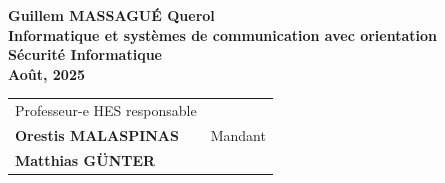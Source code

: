 \begin{titlepage}
\begin{center}
{{				%
				{\fontsize{16pt}{20pt} \textbf{Guillem MASSAGUÉ Querol}}\\[17pt]
				
				{\large 
				 \fontsize{14pt}{20pt} \textbf{Informatique et systèmes de communication avec orientation\\ Sécurité Informatique }\\[32pt]
				
				\textbf{Août, 2025}}\\[49pt]
				
				{
					\begin{tabular*}{16cm}{>{\centering}m{7.59cm}>{\centering}m{7.58cm}}
						Professeur-e HES responsable\\[13pt]
						\textbf{  Orestis MALASPINAS }
						&
						Mandant\\[12pt]
						\textbf{ Matthias GÜNTER}
					\end{tabular*}
				}
			}
			\vfill
		}%
	\end{center}
\end{titlepage}
\addtocounter{page}{1}
